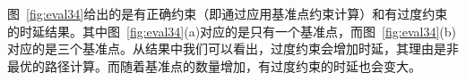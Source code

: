 \documentclass{ctexart}
\begin{document}
图~\ref{fig:eval34}给出的是有正确约束（即通过应用基准点约束计算）和有过度约束的时延结果。其中图~\ref{fig:eval34}(a)对应的是只有一个基准点，而图~\ref{fig:eval34}(b)对应的是三个基准点。从结果中我们可以看出，过度约束会增加时延，其理由是非最优的路径计算。而随着基准点的数量增加，有过度约束的时延也会变大。


\end{document}
